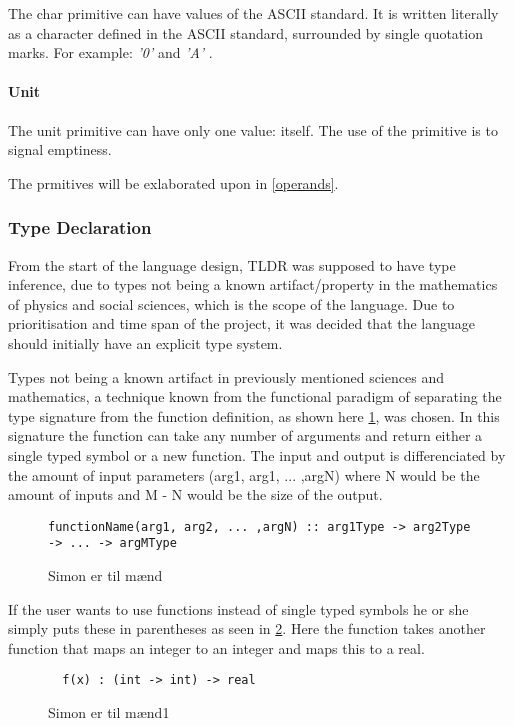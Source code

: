 The char primitive can have values of the ASCII standard. It is written literally as a character defined in the ASCII standard, surrounded by single quotation marks. For example: \emph{ '0' } and \emph{ 'A' }.

\paragraph{Unit}
\label{sec:unit}

The unit primitive can have only one value: itself. The use of the primitive is to signal emptiness.

The prmitives will be exlaborated upon in \cref{operands}.

\subsubsection{Type Declaration}
From the start of the language design, TLDR was supposed to have type inference, due to types not being a known artifact/property in the mathematics of physics and social sciences, which is the scope of the language. Due to prioritisation and time span of the project, it was decided that the language should initially have an explicit type system.

Types not being a known artifact in previously mentioned sciences and mathematics, a technique known from the functional paradigm of separating the type signature from the function definition, as shown here \cref{typesignature}, was chosen. In this signature the function can take any number of arguments and return either a single typed symbol or a new function. The input and output is differenciated by the amount of input parameters (arg1, arg1, ... ,argN) where N would be the amount of inputs and M - N would be the size of the output.

\begin{figure}
\begin{lstlisting}
functionName(arg1, arg2, ... ,argN) :: arg1Type -> arg2Type -> ... -> argMType
\end{lstlisting}
\caption{Simon er til mænd}
\label{typesignature}
\end{figure}

If the user wants to use functions instead of single typed symbols he or she simply puts these in parentheses as seen in \cref{typesignatureexample0}. Here the function takes another function that maps an integer to an integer and maps this to a real.

\begin{figure}
\begin{lstlisting}
  f(x) : (int -> int) -> real
\end{lstlisting}
\caption{Simon er til mænd1}
\label{typesignatureexample0}
\end{figure}

